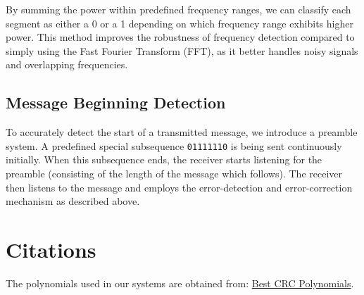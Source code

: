 \documentclass[11pt]{article}
\begin{document}
By summing the power within predefined frequency ranges, we can classify each segment as either a 0 or a 1 depending on which frequency range exhibits higher power. This method improves the robustness of frequency detection compared to simply using the Fast Fourier Transform (FFT), as it better handles noisy signals and overlapping frequencies.

\subsection{Message Beginning Detection}
To accurately detect the start of a transmitted message, we introduce a preamble system. A predefined special subsequence \texttt{01111110} is being sent continuously initially. When this subsequence ends, the receiver starts listening for the preamble (consisting of the length of the message which follows). The receiver then listens to the message and employs the error-detection and error-correction mechanism as described above.

\section{Citations}
The polynomials used in our systems are obtained from: \href{https://users.ece.cmu.edu/~koopman/crc/hd5.html}{Best CRC Polynomials}.
\end{document}
